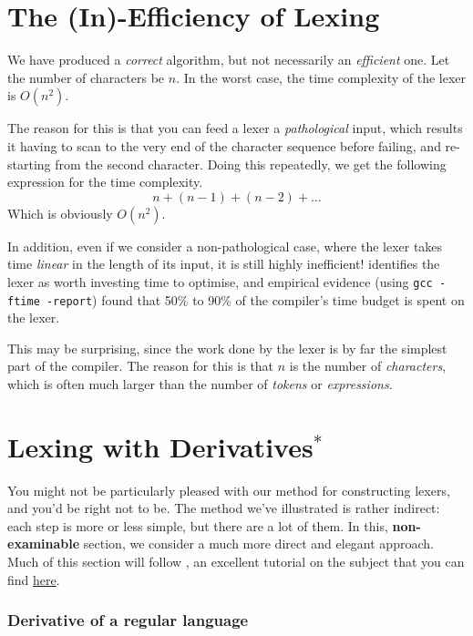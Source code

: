     
\section{The (In)-Efficiency of Lexing}
We have produced a \emph{correct} algorithm, but not necessarily an \emph{efficient} one. Let the number of characters be $n$. In the worst case, the time complexity of the lexer is $O(n^2)$. 

The reason for this is that you can feed a lexer a \emph{pathological} input, which results it having to scan to the very end of the character sequence before failing, and re-starting from the second character. Doing this repeatedly, we get the following expression for the time complexity.
\[ n + (n-1) + (n-2) + \ldots \]
Which is obviously $O(n^2)$.

In addition, even if we consider a non-pathological case, where the lexer takes time \emph{linear} in the length of its input, it is still highly inefficient! \citet{sebesta-1993} identifies the lexer as worth investing time to optimise, and empirical evidence (using \texttt{gcc -ftime -report}) found that 50\% to 90\% of the compiler's time budget is spent on the lexer.

This may be surprising, since the work done by the lexer is by far the simplest part of the compiler. The reason for this is that $n$ is the number of \emph{characters}, which is often much larger than the number of \emph{tokens} or \emph{expressions}.

\section{Lexing with Derivatives$^{*}$}
You might not be particularly pleased with our method for constructing lexers, and you'd be right not to be. The method we've illustrated is rather indirect: each step is more or less simple, but there are a lot of them. In this, \textsf{\textbf{non-examinable}} section, we consider a much more direct and elegant approach. Much of this section will follow \citet{owens-2009}, an excellent tutorial on the subject that you can find \href{https://www.cambridge.org/core/journals/journal-of-functional-programming/article/regularexpression-derivatives-reexamined/E5734B86DEB96C61C69E5CF3C4FB0AFA}{here}.

\subsubsection{Derivative of a regular language}
\vspace{3mm}

